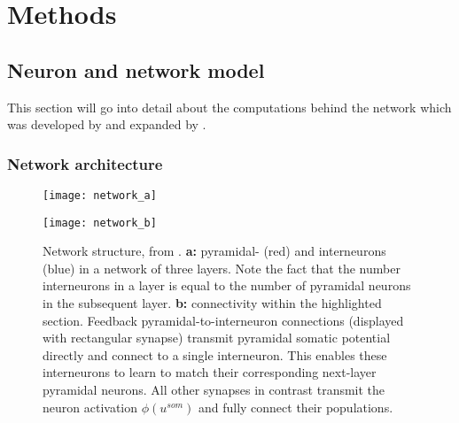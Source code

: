 
\chapter{Methods}




\section{Neuron and network model}

This section will go into detail about the computations behind the network which was developed by
\cite{sacramento2018dendritic} and expanded by \cite{Haider2021}.


\subsection{Network architecture}

\begin{figure}
  \centering
  \begin{minipage}{0.5\textwidth}
    \centering
    \texttt{[image: network\_a]}
  \end{minipage}\hfill
  \begin{minipage}{0.4\textwidth}
    \centering
    \texttt{[image: network\_b]}
  \end{minipage}
  \caption{Network structure, from \cite{Haider2021}. \textbf{a:} pyramidal- (red) and interneurons (blue) in a network of three layers. Note the fact that
    the number interneurons in a layer is equal to the number of pyramidal neurons in the subsequent layer\protect\footnotemark. \textbf{b:} connectivity
    within the highlighted section. Feedback pyramidal-to-interneuron connections (displayed with rectangular synapse) transmit
    pyramidal somatic potential directly and connect to a single interneuron. This enables these interneurons to learn to match
    their corresponding next-layer pyramidal neurons. All other synapses in contrast transmit the neuron activation
    $\phi (u^{som})$ and fully connect their populations.}
  \label{fig-network}
\end{figure}


